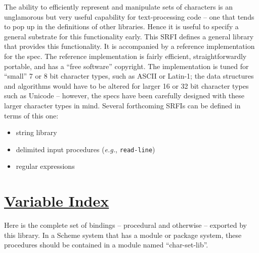 The ability to efficiently represent and manipulate sets of characters
is an unglamorous but very useful capability for text-processing code --
one that tends to pop up in the definitions of other libraries. Hence it
is useful to specify a general substrate for this functionality early.
This SRFI defines a general library that provides this functionality. It
is accompanied by a reference implementation for the spec. The reference
implementation is fairly efficient, straightforwardly portable, and has
a ``free software'' copyright. The implementation is tuned for ``small''
7 or 8 bit character types, such as ASCII or Latin-1; the data
structures and algorithms would have to be altered for larger 16 or 32
bit character types such as Unicode -- however, the specs have been
carefully designed with these larger character types in mind. Several
forthcoming SRFIs can be defined in terms of this one:

\begin{itemize}
\tightlist
\item
  string library
\item
  delimited input procedures (\emph{e.g.}, \texttt{read-line})
\item
  regular expressions
\end{itemize}

\section{\texorpdfstring{\href{}{Variable
Index}}{Variable Index}}\label{variable-index}

Here is the complete set of bindings -- procedural and otherwise --
exported by this library. In a Scheme system that has a module or
package system, these procedures should be contained in a module named
``char-set-lib''.

